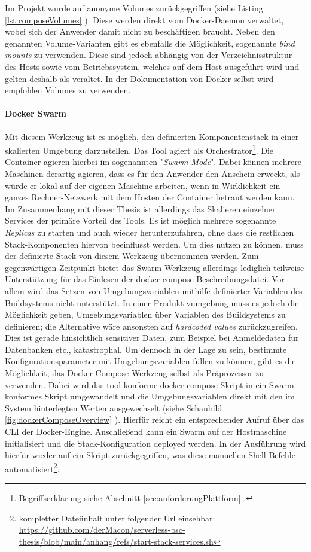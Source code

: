 Im Projekt wurde auf anonyme Volumes zurückgegriffen (siehe Listing \ref{lst:composeVolumes} ). Diese werden direkt vom Docker-Daemon verwaltet, wobei sich der Anwender damit nicht zu beschäftigen braucht. Neben den genannten Volume-Varianten gibt es ebenfalls die Möglichkeit, sogenannte \emph{bind mounts} zu verwenden. Diese sind jedoch abhängig von der Verzeichnisstruktur des Hosts sowie vom Betriebssystem, welches auf dem Host ausgeführt wird und gelten deshalb als veraltet. In der Dokumentation von Docker selbst wird empfohlen Volumes zu verwenden.

\paragraph{Docker Swarm}
Mit diesem Werkzeug ist es möglich, den definierten Komponentenstack in einer skalierten Umgebung darzustellen. Das Tool agiert als Orchestrator\footnote{Begriffserklärung siehe Abschnitt \ref{sec:anforderungPlattform} .}. Die Container agieren hierbei im sogenannten "\emph{Swarm Mode}". Dabei können mehrere Maschinen derartig agieren, dass es für den Anwender den Anschein erweckt, als würde er lokal auf der eigenen Maschine arbeiten, wenn in Wirklichkeit ein ganzes Rechner-Netzwerk mit dem Hosten der Container betraut werden kann. Im Zusammenhang mit dieser Thesis ist allerdings das Skalieren einzelner Services der primäre Vorteil des Tools. Es ist möglich mehrere sogenannte \emph{Replicas} zu starten und auch wieder herunterzufahren, ohne dass die restlichen Stack-Komponenten hiervon beeinflusst werden. Um dies nutzen zu können, muss der definierte Stack von diesem Werkzeug übernommen werden. Zum gegenwärtigen Zeitpunkt bietet das Swarm-Werkzeug allerdings lediglich teilweise Unterstützung für das Einlesen der docker-compose Beschreibungsdatei. Vor allem wird das Setzen von Umgebungsvariablen mithilfe definierter Variablen des Buildsystems nicht unterstützt. In einer Produktivumgebung muss es jedoch die Möglichkeit geben, Umgebungsvariablen über Variablen des Buildsystems zu definieren; die Alternative wäre ansonsten auf \emph{hardcoded values} zurückzugreifen. Dies ist gerade hinsichtlich sensitiver Daten, zum Beispiel bei Anmeldedaten für Datenbanken etc., katastrophal. Um dennoch in der Lage zu sein, bestimmte Konfigurationsparameter mit Umgebungsvariablen füllen zu können, gibt es die Möglichkeit, das Docker-Compose-Werkzeug selbst als Präprozessor zu verwenden. Dabei wird das tool-konforme docker-compose Skript in ein Swarm-konformes Skript umgewandelt und die Umgebungsvariablen direkt mit den im System hinterlegten Werten ausgewechselt (siehe Schaubild \ref{fig:dockerComposeOverview} ). Hierfür reicht ein entsprechender Aufruf über das CLI der Docker-Engine. Anschließend kann ein Swarm auf der Hostmaschine initialisiert und die Stack-Konfiguration deployed werden. In der Ausführung wird hierfür wieder auf ein Skript zurückgegriffen, was diese manuellen Shell-Befehle automatisiert\footnote{kompletter Dateiinhalt unter folgender Url einsehbar: \url{https://github.com/derMacon/serverless-bsc-thesis/blob/main/anhang/refs/start-stack-services.sh}}.

